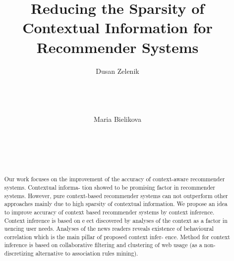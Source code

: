 \documentclass{acm_proc_article-sp} %
\begin{document}
\title{Reducing the Sparsity of Contextual Information for
Recommender Systems}


\author{
\alignauthor
Dusan Zelenik\\
       \\
       \\
       \\
       \\
\alignauthor
Maria Bielikova\\
       \\
       \\
       \\
       \\
}

\maketitle

\begin{abstract}
Our work focuses on the improvement of the accuracy of
context-aware recommender systems. Contextual informa-
tion showed to be promising factor in recommender systems.
However, pure context-based recommender systems can not
outperform other approaches mainly due to high sparsity
of contextual information. We propose an idea to improve
accuracy of context based recommender systems by context
inference. Context inference is based on eect discovered
by analyses of the context as a factor in
uencing user needs.
Analyses of the news readers reveals existence of behavioural
correlation which is the main pillar of proposed context infer-
ence. Method for context inference is based on collaborative
filtering and clustering of web usage (as a non-discretizing
alternative to association rules mining).
\end{abstract}



\end{document}

